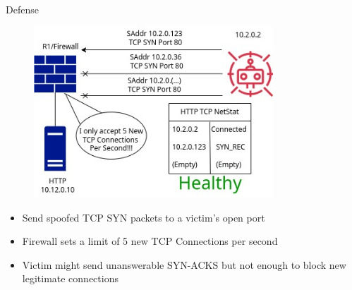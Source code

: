 \documentclass{beamer}
\begin{document}
\begin{frame}
\begin{columns}
    \begin{column}{0.5\textwidth}
        \\
        \Large Defense
        \begin{figure}
            \centering
            \includegraphics[width=0.8\textwidth]{flood_defense.jpg}\\
        \end{figure}
            \begin{itemize}[label={}]
                \item \footnotesize Send spoofed TCP SYN packets to a victim's open port
                \item \footnotesize Firewall sets a limit of 5 new TCP Connections per second
                \item \footnotesize Victim might send unanswerable SYN-ACKS but not enough to block new legitimate connections
            \end{itemize}
    \end{column}
\end{columns}
\end{frame}
\end{document}
